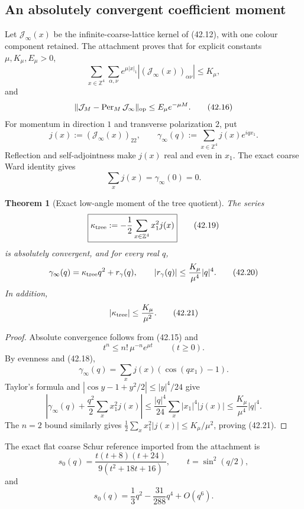 \documentclass[11pt,oneside]{book}
\newtheorem{theorem}{Theorem}[chapter]
\theoremstyle{definition}
\theoremstyle{remark}
\begin{document}
\subsection{An absolutely convergent coefficient moment}

Let \(\mathcal J_\infty(x)\) be the infinite-coarse-lattice kernel
of (42.12), with one colour component retained.  The attachment proves
that for explicit constants \(\mu,K_\mu,E_\mu>0\),
\[
 \sum_{x\in\mathbb Z^4}\sum_{\alpha,\nu}
 e^{\mu|x|_1}|(\mathcal J_\infty(x))_{\alpha\nu}|
 \le K_\mu,                                                     \tag{42.15}
\]
and
\[
 \|\mathcal J_M-\operatorname{Per}_M\mathcal J_\infty\|_{\rm op}
 \le E_\mu e^{-\mu M}.                                         \tag{42.16}
\]
For momentum in direction \(1\) and transverse polarization \(2\),
put
\[
 j(x):=(\mathcal J_\infty(x))_{22},\qquad
 \gamma_\infty(q):=\sum_{x\in\mathbb Z^4}j(x)e^{iqx_1}.         \tag{42.17}
\]
Reflection and self-adjointness make \(j(x)\) real and even in
\(x_1\).  The exact coarse Ward identity gives
\[
 \sum_xj(x)=\gamma_\infty(0)=0.                                \tag{42.18}
\]

\begin{theorem}[Exact low-angle moment of the tree quotient]
\label{thm:e8v42-moment}
The series
\[
 \boxed{
 \kappa_{\rm tree}:=-\frac12\sum_{x\in\mathbb Z^4}x_1^2j(x)}    \tag{42.19}
\]
is absolutely convergent, and for every real \(q\),
\[
 \gamma_\infty(q)
 =\kappa_{\rm tree}q^2+r_\gamma(q),\qquad
 |r_\gamma(q)|\le\frac{K_\mu}{\mu^4}|q|^4.                     \tag{42.20}
\]
In addition,
\[
 |\kappa_{\rm tree}|\le\frac{K_\mu}{\mu^2}.                    \tag{42.21}
\]
\end{theorem}

\begin{proof}
Absolute convergence follows from (42.15) and
\[
 t^n\le n!\,\mu^{-n}e^{\mu t}\qquad(t\ge0).
\]
By evenness and (42.18),
\[
 \gamma_\infty(q)
 =\sum_xj(x)(\cos(qx_1)-1).
\]
Taylor's formula and
\(|\cos y-1+y^2/2|\le |y|^4/24\) give
\[
 \left|\gamma_\infty(q)
 +\frac{q^2}{2}\sum_xx_1^2j(x)\right|
 \le\frac{|q|^4}{24}\sum_x|x_1|^4|j(x)|
 \le\frac{K_\mu}{\mu^4}|q|^4.
\]
The \(n=2\) bound similarly gives
\(\frac12\sum_xx_1^2|j(x)|\le K_\mu/\mu^2\), proving
(42.21).
\end{proof}

The exact flat coarse Schur reference imported from the attachment is
\[
 s_0(q)
 =\frac{t(t+8)(t+24)}{9(t^2+18t+16)},\qquad
 t=\sin^2(q/2),                                                 \tag{42.22}
\]
and
\[
 s_0(q)=\frac13q^2-\frac{31}{288}q^4+O(q^6).                   \tag{42.23}
\]
\end{document}
